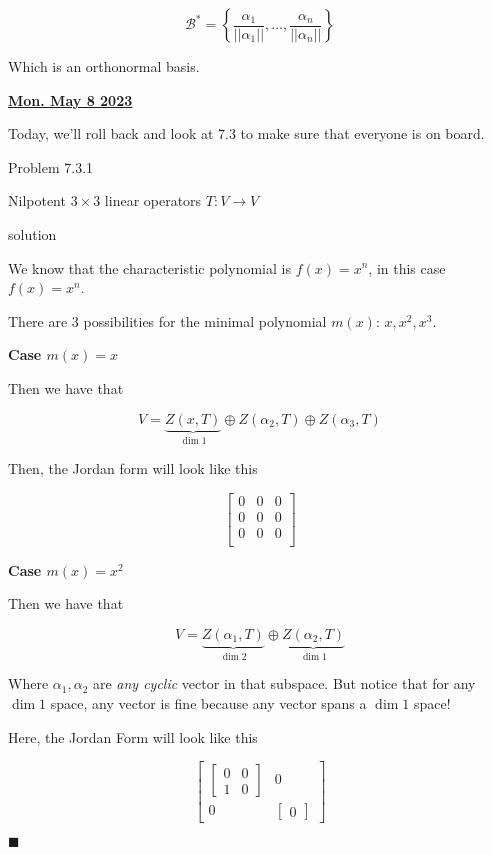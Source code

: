 \documentclass[12pt]{article}
\renewcommand{\date}[1]{\underline{\bf #1}}
\def\B{\mathcal B}
\newenvironment{solution}{
  \begin{leftbar}

  \noin
  {\large \sc solution} \\
}
{

  \medskip
  \noin
  \textcolor{proof_fg}{$\blacksquare$}

  \end{leftbar}
}
\newcommand{\prob}[3]{
  \bigskip \bigskip \noin
  {\Large\sc Problem #1}

  \medskip\noin
  #2

  \begin{solution}
    \noin
    #3
  \end{solution}
}
\begin{document}
  \[
    \B^* = \left\{\frac{\alpha_1}{||\alpha_1||}, \dots, \frac{\alpha_n}{||\alpha_n||}\right\}
  \]

  Which is an orthonormal basis.

  \date{Mon. May 8 2023}


  Today, we'll roll back and look at 7.3 to make sure that everyone is on board.

  \prob{7.3.1}
  {
    Nilpotent $3 \times 3$ linear operators $T: V \to V$
  }
  {
    We know that the characteristic polynomial is $f(x) = x^n$, in this case
    $f(x) = x^n$.

    There are 3 possibilities for the minimal polynomial $m(x)$: $x, x^2, x^3$.

    {\bf Case $m(x) = x$}

    Then we have that 

    \[
      V = \underbrace{Z(x, T)}_{\dim 1} \oplus Z(\alpha_2, T) \oplus Z(\alpha_3, T)
    \]

    Then, the Jordan form will look like this

    \[
      \begin{bmatrix}
        0 & 0 & 0 \\
        0 & 0 & 0 \\
        0 & 0 & 0 \\
      \end{bmatrix}
    \]


    {\bf Case $m(x) = x^2$}

    Then we have that 

    \[
      V = \underbrace{Z(\alpha_1, T)}_{\dim 2} \oplus \underbrace{Z(\alpha_2,
      T)}_{\dim 1}
    \]

    Where $\alpha_1, \alpha_2$ are {\it any cyclic} vector in that subspace. But
    notice that for any $\dim 1$ space, any vector is fine because any vector
    spans a $\dim 1$ space!

    Here, the Jordan Form will look like this

    \[
      \begin{bmatrix}
        \begin{bmatrix}
          0 & 0 \\
          1 & 0
        \end{bmatrix}
        & 0 \\
        0 & \begin{bmatrix}
          0
        \end{bmatrix}
      \end{bmatrix}
    \]


}
\end{document}
